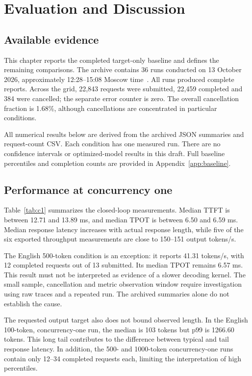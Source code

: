 \chapter{Evaluation and Discussion}
\label{chap:eval}

\section{Available evidence}
This chapter reports the completed target-only baseline and defines the remaining comparisons. The archive contains 36 runs conducted on 13 October 2026, approximately 12:28--15:08 Moscow time~\cite{baseline}. All runs produced complete reports. Across the grid, 22,843 requests were submitted, 22,459 completed and 384 were cancelled; the separate error counter is zero. The overall cancellation fraction is 1.68\%, although cancellations are concentrated in particular conditions.

All numerical results below are derived from the archived JSON summaries and request-count CSV. Each condition has one measured run. There are no confidence intervals or optimized-model results in this draft. Full baseline percentiles and completion counts are provided in Appendix~\ref{app:baseline}.

\section{Performance at concurrency one}
Table~\ref{tab:c1} summarizes the closed-loop measurements. Median TTFT is between 12.71 and 13.89 ms, and median TPOT is between 6.50 and 6.59 ms. Median response latency increases with actual response length, while five of the six exported throughput measurements are close to 150--151 output tokens/s.



The English 500-token condition is an exception: it reports 41.31 tokens/s, with 12 completed requests out of 13 submitted. Its median TPOT remains 6.57 ms. This result must not be interpreted as evidence of a slower decoding kernel. The small sample, cancellation and metric observation window require investigation using raw traces and a repeated run. The archived summaries alone do not establish the cause.

The requested output target also does not bound observed length. In the English 100-token, concurrency-one run, the median is 103 tokens but p99 is 1266.60 tokens. This long tail contributes to the difference between typical and tail response latency. In addition, the 500- and 1000-token concurrency-one runs contain only 12--34 completed requests each, limiting the interpretation of high percentiles.

